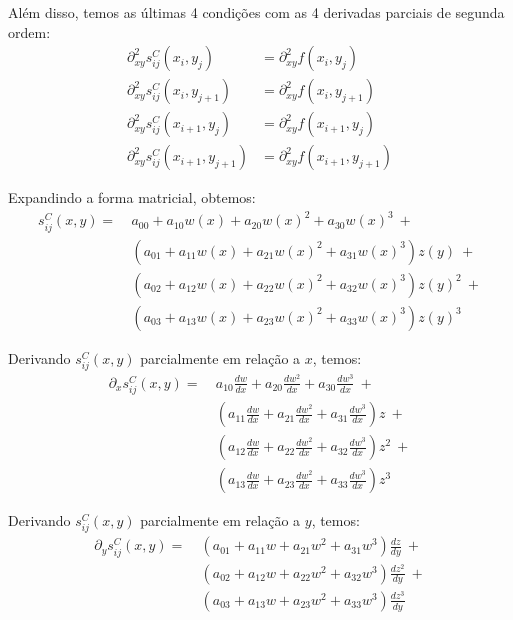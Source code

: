 \documentclass[a4paper, 12pt]{article}
\begin{document}
Além disso, temos as últimas 4 condições com as 4 derivadas parciais de segunda
ordem:
\begin{align}
    \partial_{xy}^{2}s_{ij}^C(x_{i}, y_{j})      &= \partial_{xy}^{2}f(x_{i}, y_{j}) \tag{13}      \\
    \partial_{xy}^{2}s_{ij}^C(x_{i}, y_{j+1})    &= \partial_{xy}^{2}f(x_{i}, y_{j+1}) \tag{14}    \\
    \partial_{xy}^{2}s_{ij}^C(x_{i+1}, y_{j})    &= \partial_{xy}^{2}f(x_{i+1}, y_{j}) \tag{15}    \\
    \partial_{xy}^{2}s_{ij}^C(x_{i+1}, y_{j+1})  &= \partial_{xy}^{2}f(x_{i+1}, y_{j+1}) \tag{16}
\end{align}

Expandindo a forma matricial, obtemos:
\begin{align*}
    s_{ij}^C(x,y) =\ &a_{00} + a_{10}w{(x)} + a_{20}w{(x)}^{2} + a_{30}w{(x)}^{3}\ +          \\ 
               &{(a_{01} + a_{11}w{(x)} + a_{21}w{(x)}^{2} + a_{31}w{(x)}^{3})}z{(y)}\ +     \\ 
               &{(a_{02} + a_{12}w{(x)} + a_{22}w{(x)}^{2} + a_{32}w{(x)}^{3})}z{(y)}^{2}\ + \\
               &{(a_{03} + a_{13}w{(x)} + a_{23}w{(x)}^{2} + a_{33}w{(x)}^{3})}z{(y)}^{3}
\end{align*}

Derivando $s_{ij}^C(x,y)$ parcialmente em relação a $x$, temos:
\begin{align*}
    \partial_{x}s_{ij}^C(x, y) =\ &a_{10}\frac{dw}{dx} + a_{20}\frac{dw^2}{dx} + a_{30}\frac{dw^3}{dx}\ +         \\
                            &\left(a_{11}\frac{dw}{dx} + a_{21}\frac{dw^2}{dx} + a_{31}\frac{dw^3}{dx}\right)z\ + \\ 
                            &\left(a_{12}\frac{dw}{dx} + a_{22}\frac{dw^2}{dx} + a_{32}\frac{dw^3}{dx}\right)z^2\ + \\ 
                            &\left(a_{13}\frac{dw}{dx} + a_{23}\frac{dw^2}{dx} + a_{33}\frac{dw^3}{dx}\right)z^3 
\end{align*}

Derivando $s_{ij}^C(x,y)$ parcialmente em relação a $y$, temos:
\begin{align*}
    \partial_{y}s_{ij}^C(x, y) =\ &\left(a_{01} + a_{11}w + a_{21}w^2 + a_{31}w^3\right)\frac{dz}{dy}\ + \\ 
                                  &\left(a_{02} + a_{12}w + a_{22}w^2 + a_{32}w^3\right)\frac{dz^2}{dy}\ + \\ 
                                  &\left(a_{03} + a_{13}w + a_{23}w^2 + a_{33}w^3\right)\frac{dz^3}{dy} 
\end{align*}
\end{document}
